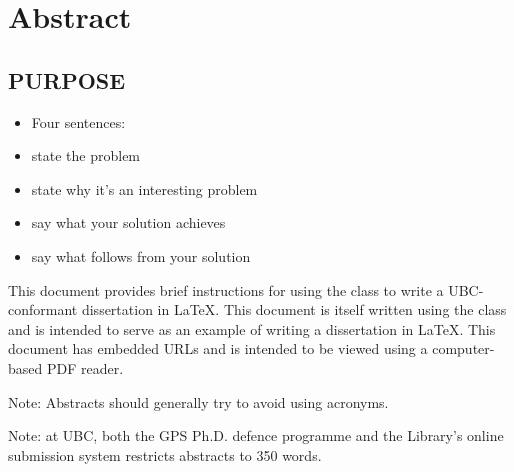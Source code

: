 
\chapter{Abstract}

\section*{PURPOSE}
\begin{itemize}
\item Four sentences:
\item state the problem
\item state why it's an interesting problem
\item say what your solution achieves
\item say what follows from your solution
\end{itemize}


This document provides brief instructions for using the 
class to write a \acs{UBC}-conformant dissertation in \LaTeX.  This
document is itself written using the  class and is
intended to serve as an example of writing a dissertation in \LaTeX.
This document has embedded \acp{URL} and is intended to be viewed
using a computer-based \ac{PDF} reader.

Note: Abstracts should generally try to avoid using acronyms.

Note: at \ac{UBC}, both the \ac{GPS} Ph.D. defence programme and the
Library's online submission system restricts abstracts to 350
words.

